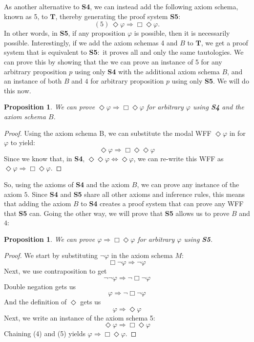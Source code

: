 \documentclass[11pt]{article}
\newtheorem{proposition}[theorem]{Proposition}
\theoremstyle{definition}
\theoremstyle{remark}
\begin{document}
As another alternative to \textbf{S4}, we can instead add the following axiom schema, known as 5, to $\mathbf{T}$, thereby generating the proof system \textbf{S5}:
$$(5) \ \Diamond \varphi\Rightarrow\Box\Diamond \varphi.$$
In other words, in \textbf{S5}, if any proposition $\varphi$ is possible, then it is necessarily possible. Interestingly, if we add the axiom schemas 4 and $B$ to $\mathbf{T}$, we get a proof system that is equivalent to \textbf{S5}:\ it proves all and only the same tautologies. We can prove this by showing that the we can prove an instance of 5 for any arbitrary proposition $p$ using only \textbf{S4} with the additional axiom schema $B$, and an instance of both $B$ and $4$ for arbitrary proposition $p$ using only \textbf{S5}. We will do this now.
\begin{proposition}
    We can prove $\Diamond \varphi \Rightarrow \Box\Diamond \varphi$ for arbitrary $\varphi$ using \textbf{S4} and the axiom schema $B$.
\end{proposition}
\begin{proof}
    Using the axiom schema B, we can substitute the modal WFF $\Diamond \varphi$ in for $\varphi$ to yield:
    $$\Diamond \varphi \Rightarrow\Box\Diamond \Diamond \varphi$$
    Since we know that, in \textbf{S4}, $\Diamond \Diamond \varphi \iff \Diamond \varphi$, we can re-write this WFF as
    $\Diamond \varphi \Rightarrow\Box\Diamond \varphi.$
\end{proof}
\noindent
So, using the axioms of \textbf{S4} and the axiom $B$, we can prove any instance of the axiom $5$. Since \textbf{S4} and \textbf{S5} share all other axioms and inference rules, this means that adding the axiom $B$ to \textbf{S4} creates a proof system that can prove any WFF that \textbf{S5} can. Going the other way, we will prove that \textbf{S5} allows us to prove $B$ and $4$:
\begin{proposition}
    We can prove $\varphi \Rightarrow \Box\Diamond \varphi$ for arbitrary $\varphi$ using \textbf{S5}.
\end{proposition}
\begin{proof}
    We start by substituting $\neg \varphi$ in the axiom schema $M$:
    \begin{equation}
        \Box\neg \varphi \Rightarrow \neg \varphi
    \end{equation}
    Next, we use contraposition to get
    \begin{equation}
        \neg\neg \varphi \Rightarrow \neg\Box\neg \varphi
    \end{equation}
    Double negation gets us
    \begin{equation}
        \varphi \Rightarrow \neg\Box\neg \varphi
    \end{equation}
    And the definition of $\Diamond$ gets us
    \begin{equation}
        \varphi\Rightarrow \Diamond \varphi
    \end{equation}
    Next, we write an instance of the axiom schema 5:
    \begin{equation}
        \Diamond \varphi \Rightarrow \Box\Diamond \varphi
    \end{equation}
    Chaining (4) and (5) yields $\varphi \Rightarrow \Box\Diamond \varphi$.
\end{proof}
\end{document}
